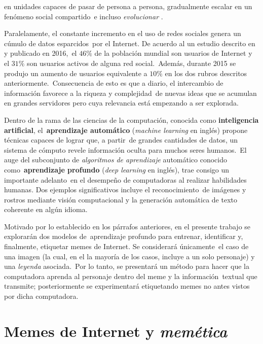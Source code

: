 en unidades capaces de pasar de persona a persona, gradualmente escalar en un fenómeno social compartido\
e incluso \emph{evolucionar} \cite{shifman2014}.\par
Paralelamente, el constante incremento en el uso de redes sociales genera un cúmulo de datos esparcidos\
por el Internet. De acuerdo al un estudio descrito en \cite{website:smartinsights} y publicado en 2016,\
el $46\%$ de la población mundial son usuarios de Internet y el $31\%$ son usuarios activos de alguna red social.\
Además, durante 2015 se produjo un aumento de usuarios equivalente a $10\%$ en los dos rubros descritos anteriormente.\
Consecuencia de esto es que a diario, el intercambio de información favorece a la riqueza y complejidad\
de nuevas ideas que se acumulan en grandes servidores pero cuya relevancia está empezando a ser explorada.\par
Dentro de la rama de las ciencias de la computación, conocida como \textbf{inteligencia artificial}, el\
\textbf{aprendizaje automático} (\emph{machine learning} en inglés) propone técnicas capaces de lograr que, a partir\
de grandes cantidades de datos, un sistema de cómputo revele información oculta para muchos seres humanos.\
El auge del subconjunto de \emph{algoritmos de aprendizaje} automático conocido como\
\textbf{aprendizaje profundo} (\emph{deep learning} en inglés), trae consigo un importante adelanto\
en el desempeño de computadoras al realizar habilidades humanas. Dos ejemplos significativos incluye el reconocimiento\
de imágenes y rostros mediante visión computacional y la generación automática de texto coherente en algún idioma.\par
Motivado por lo establecido en los párrafos anteriores, en el presente trabajo se explorarán dos modelos de\
aprendizaje profundo para entrenar, identificar y, finalmente, etiquetar memes de Internet. Se considerará únicamente\
el caso de una imagen (la cual, en el la mayoría de los casos, incluye a un solo personaje) y una \emph{leyenda} asociada.\
Por lo tanto, se presentará un método para hacer que la computadora aprenda al personaje dentro del meme y la información\
textual que transmite; posteriormente se experimentará etiquetando memes no antes vistos por dicha computadora.

\section{Memes de Internet y \emph{memética}}

